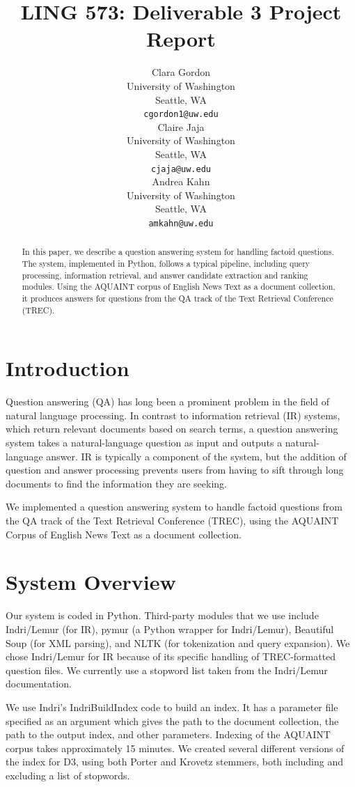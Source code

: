\documentclass[11pt]{article}
\title{LING 573: Deliverable 3 Project Report}
\author{Clara Gordon \\
  University of Washington \\
  Seattle, WA \\
  {\tt cgordon1@uw.edu} \\\And
  Claire Jaja \\
  University of Washington \\
  Seattle, WA \\
  {\tt cjaja@uw.edu} \\\And
  Andrea Kahn \\
  University of Washington \\
  Seattle, WA \\
  {\tt amkahn@uw.edu} \\}
\date{}
\begin{document}
\maketitle
\begin{abstract}

In this paper, we describe a question answering system for handling factoid questions.  The system, implemented in Python, follows a typical pipeline, including query processing, information retrieval, and answer candidate extraction and ranking modules. Using the AQUAINT corpus of English News Text as a document collection, it produces answers for questions from the QA track of the Text Retrieval Conference (TREC).

\end{abstract}

\section{Introduction}

Question answering (QA) has long been a prominent problem in the field of natural language processing. In contrast to information retrieval (IR) systems, which return relevant documents based on search terms, a question answering system takes a natural-language question as input and outputs a natural-language answer. IR is typically a component of the system, but the addition of question and answer processing prevents users from having to sift through long documents to find the information they are seeking.

We implemented a question answering system to handle factoid questions from the QA track of the Text Retrieval Conference (TREC), using the AQUAINT Corpus of English News Text as a document collection.

\section{System Overview}

Our system is coded in Python. Third-party modules that we use include Indri/Lemur (for IR), pymur (a Python wrapper for Indri/Lemur), Beautiful Soup (for XML parsing), and NLTK (for tokenization and query expansion). We chose Indri/Lemur for IR because of its specific handling of TREC-formatted question files. We currently use a stopword list taken from the Indri/Lemur documentation.

We use Indri's IndriBuildIndex code to build an index.  It has a parameter file specified as an argument which gives the path to the document collection, the path to the output index, and other parameters.  Indexing of the AQUAINT corpus takes approximately 15 minutes.  We created several different versions of the index for D3, using both Porter and Krovetz stemmers, both including and excluding a list of stopwords.
\end{document}
